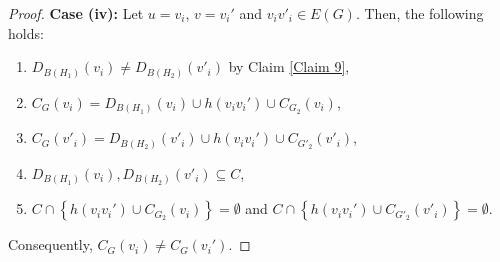 \documentclass[10pt,a4paper]{amsart}
\begin{document}
\begin{proof}
\textbf{Case (iv):}
Let $u=v_i$, $v=v_i'$ and $v_iv'_i\in E(G)$.
Then, the following holds:
\begin{enumerate}
    \item $D_{B(H_1)}(v_i) \neq D_{B(H_2)} (v'_i)$ by Claim \ref{Claim 9},
    
    \item $C_G(v_i)=D_{B(H_1)}(v_i)\cup h(v_i v_i') \cup C_{G_2}(v_i)$,
    
    \item $C_G(v'_i)=D_{B(H_2)}(v'_i)\cup h(v_i v_i') \cup C_{G'_2}(v'_i)$,
    
    \item $D_{B(H_1)}(v_i), D_{B(H_2)}(v'_i)\subseteq C$,

    \item 
    $C \cap \left\{ h(v_i v_i') \cup C_{G_2}(v_i) \right\} = \emptyset$ and $C \cap \left\{ h(v_i v_i') \cup C_{G'_2}(v'_i) \right\} = \emptyset$.
\end{enumerate}

Consequently, $C_G(v_i) \neq C_G(v_i')$. 
\end{proof}
\end{document}
